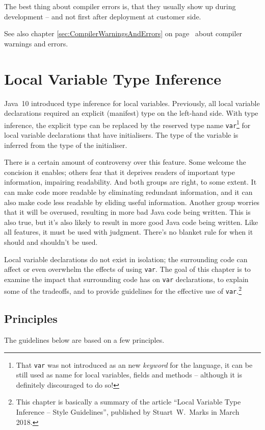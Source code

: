\documentclass[11pt,a4paper, titlepage, parskip=half, headsepline, footsepline, cleardoublepage=current, headheight=1cm]{scrbook}
\newcommand*{\tqvref}[1]{\hyperref[{#1}]{\ref*{#1}} on page~\pageref{#1}}
\begin{document}
The best thing about compiler errors is, that they usually show up during development – and not first after deployment at customer side.

See also chapter \tqvref{sec:CompilerWarningsAndErrors} about compiler warnings and errors.

\section{Local Variable Type Inference}\label{sec:LocalVariableTypeInference}
Java~10 introduced type inference for local variables. Previously, all local variable declarations required an explicit (manifest) type on the left-hand side. With type inference, the explicit type can be replaced by the reserved type name \lstinline|var|\footnote{That \lstinline|var| was not introduced as an new \textit{keyword} for the language, it can be still used as name for local variables, fields and methods – although it is definitely discouraged to do so!} for local variable declarations that have initialisers. The type of the variable is inferred from the type of the initialiser.

There is a certain amount of controversy over this feature. Some welcome the concision it enables; others fear that it deprives readers of important type information, impairing readability. And both groups are right, to some extent. It can make code more readable by eliminating redundant information, and it can also make code less readable by eliding useful information. Another group worries that it will be overused, resulting in more bad Java code being written. This is also true, but it’s also likely to result in more good Java code being written. Like all features, it must be used with judgment. There’s no blanket rule for when it should and shouldn’t be used. 

Local variable declarations do not exist in isolation; the surrounding code can affect or even overwhelm the effects of using \lstinline|var|. The goal of this chapter is to examine the impact that surrounding code has on \lstinline|var| declarations, to explain some of the tradeoffs, and to provide guidelines for the effective use of \lstinline|var|.\footnote{This chapter is basically a summary of the article “Local Variable Type Inference – Style Guidelines”, published by Stuart~W.~Marks in March 2018\autocite{Marks:LocalVariableTypeInference}.}

\subsection{Principles}
The guidelines below are based on a few principles.
\end{document}
